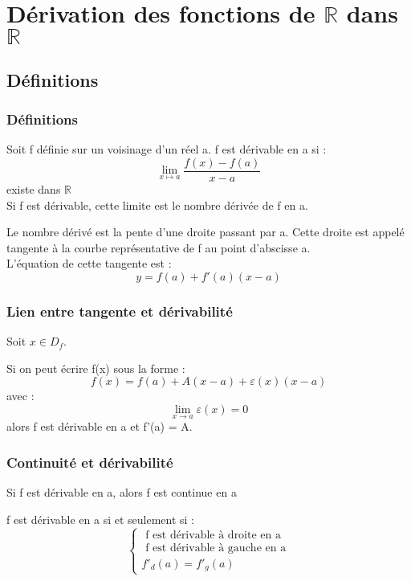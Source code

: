\chapter{Dérivation des fonctions de $\mathbb{R}$ dans $\mathbb{R}$}
\section{Définitions}
\subsection{Définitions}
\begin{de}
Soit f définie sur un voisinage d'un réel a.
f est dérivable en a si :
$$\lim_{x \mapsto a} \dfrac{f(x)-f(a)}{x-a}$$
existe dans $\mathbb{R}$\\
Si f est dérivable, cette limite est le nombre dérivée de f en a.
\end{de}
\begin{prop}
Le nombre dérivé est la pente d'une droite passant par a. Cette droite est appelé tangente à la courbe représentative de f au point d'abscisse a.\\
L'équation de cette tangente est :
$$y = f(a) +f'(a)(x-a)$$
\end{prop}
\subsection{Lien entre tangente et dérivabilité}
Soit $x \in D_f$.
\begin{prop}
 Si on peut écrire f(x) sous la forme :
$$f(x) = f(a)+A(x-a)+\varepsilon(x)(x-a)$$
avec :
$$\lim_{x \rightarrow a} \varepsilon(x) = 0$$
alors f est dérivable en a et f'(a) = A.
\end{prop}
\subsection{Continuité et dérivabilité}
\begin{prop}
Si f est dérivable en a, alors f est continue en a
\end{prop}
\begin{prop}
f est dérivable en a si et seulement si :
$$\left\{\begin{array}{l}
    \mbox{ f est dérivable à droite en a}\\
    \mbox{ f est dérivable à gauche en a}\\
    f'_d(a) = f'_g(a)
  \end{array}\right.$$
\end{prop}

